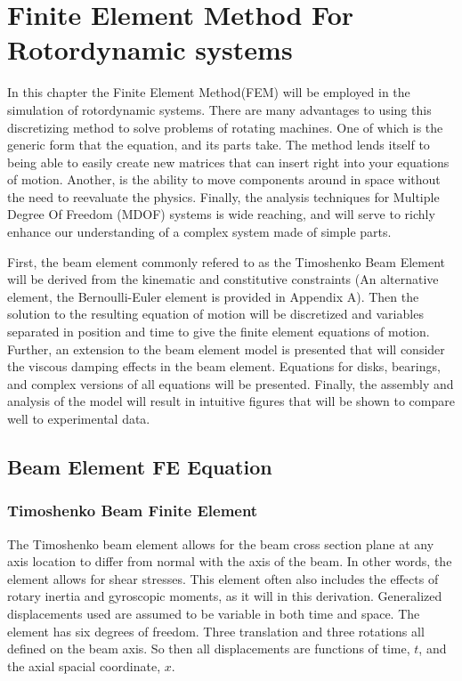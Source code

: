 \chapter{Finite Element Method For Rotordynamic systems}
In this chapter the Finite Element Method(FEM) will be employed in the simulation of rotordynamic systems. There are many advantages to using this discretizing method to solve problems of rotating machines. One of which is the generic form that the equation, and its parts take. The method lends itself to being able to easily create new matrices that can insert right into your equations of motion. Another, is the ability to move components around in space without the need to reevaluate the physics. Finally, the analysis techniques for Multiple Degree Of Freedom (MDOF) systems is wide reaching, and will serve to richly enhance our understanding of a complex system made of simple parts.\par 
First, the beam element commonly refered to as the Timoshenko Beam Element will be derived from the kinematic and constitutive constraints (An alternative element, the Bernoulli-Euler element is provided in Appendix A). Then the solution to the resulting equation of motion will be discretized and variables separated in position and time to give the finite element equations of motion. Further, an extension to the beam element model is presented that will consider the viscous damping effects in the beam element. Equations for disks, bearings, and complex versions of all equations will be presented. Finally, the assembly and analysis of the model will result in intuitive figures that will be shown to compare well to experimental data.
\section{Beam Element FE Equation} \label{Beam Element FE Equation}
\subsection{Timoshenko Beam Finite Element} \label{Timoshenko Beam Finite Element}
The Timoshenko beam element allows for the beam cross section plane at any axis location to differ from normal with the axis of the beam. In other words, the element allows for shear stresses. This element often also includes the effects of rotary inertia and gyroscopic moments, as it will in this derivation. Generalized displacements used are assumed to be variable in both time and space. The element has six degrees of freedom. Three translation and three rotations all defined on the beam axis. So then all displacements are functions of time, $ t $, and the axial spacial coordinate, $ x $.
